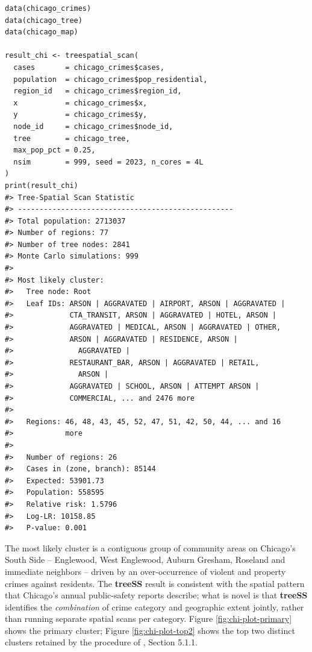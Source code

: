 \begin{verbatim}
data(chicago_crimes)
data(chicago_tree)
data(chicago_map)

result_chi <- treespatial_scan(
  cases       = chicago_crimes$cases,
  population  = chicago_crimes$pop_residential,
  region_id   = chicago_crimes$region_id,
  x           = chicago_crimes$x,
  y           = chicago_crimes$y,
  node_id     = chicago_crimes$node_id,
  tree        = chicago_tree,
  max_pop_pct = 0.25,
  nsim        = 999, seed = 2023, n_cores = 4L
)
print(result_chi)
#> Tree-Spatial Scan Statistic
#> -------------------------------------------------- 
#> Total population: 2713037 
#> Number of regions: 77 
#> Number of tree nodes: 2841 
#> Monte Carlo simulations: 999 
#> 
#> Most likely cluster:
#>   Tree node: Root 
#>   Leaf IDs: ARSON | AGGRAVATED | AIRPORT, ARSON | AGGRAVATED |
#>             CTA_TRANSIT, ARSON | AGGRAVATED | HOTEL, ARSON |
#>             AGGRAVATED | MEDICAL, ARSON | AGGRAVATED | OTHER,
#>             ARSON | AGGRAVATED | RESIDENCE, ARSON |
#>               AGGRAVATED |
#>             RESTAURANT_BAR, ARSON | AGGRAVATED | RETAIL,
#>               ARSON |
#>             AGGRAVATED | SCHOOL, ARSON | ATTEMPT ARSON |
#>             COMMERCIAL, ... and 2476 more
#> 
#>   Regions: 46, 48, 43, 45, 52, 47, 51, 42, 50, 44, ... and 16
#>            more
#> 
#>   Number of regions: 26 
#>   Cases in (zone, branch): 85144 
#>   Expected: 53901.73 
#>   Population: 558595 
#>   Relative risk: 1.5796 
#>   Log-LR: 10158.85 
#>   P-value: 0.001
\end{verbatim}

The most likely cluster is a contiguous group of community areas on
Chicago's South Side -- Englewood, West Englewood, Auburn Gresham, Roseland
and immediate neighbors -- driven by an over-occurrence of violent and
property crimes against residents. The \textbf{treeSS} result is consistent
with the spatial pattern that Chicago's annual public-safety reports
describe; what is novel is that \textbf{treeSS} identifies the \emph{combination}
of crime category and geographic extent jointly, rather than running
separate spatial scans per category. Figure \ref{fig:chi-plot-primary}
shows the primary cluster; Figure \ref{fig:chi-plot-top2} shows the
top two distinct clusters retained by the procedure of \citet{cancado2025},
Section 5.1.1.

